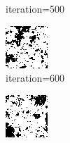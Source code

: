\documentclass{article}
\begin{document}
\begin{figure}[h]
\begin{subfigure}[t]{0.18\textwidth}
\vspace{-0.6cm}
\caption{iteration=500}
\end{subfigure}\hspace{0.01\textwidth}
\begin{subfigure}[t]{0.18\textwidth}
\centering
\includegraphics[width=\textwidth]{./computational/results/gibbs_comb_sampler_positive_iter_600.png}
\vspace{-0.6cm}
\caption{iteration=600}
\end{subfigure}\hspace{0.01\textwidth}
\begin{subfigure}[t]{0.18\textwidth}
\centering
\includegraphics[width=\textwidth]{./computational/results/gibbs_comb_sampler_positive_iter_700.png}

\end{subfigure}
\end{figure}
\end{document}
